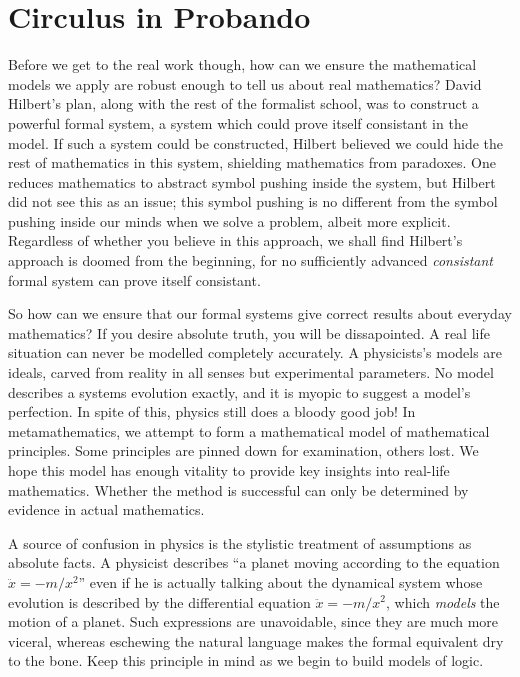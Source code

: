 \section{Circulus in Probando}

Before we get to the real work though, how can we ensure the mathematical models we apply are robust enough to tell us about real mathematics? David Hilbert's plan, along with the rest of the formalist school, was to construct a powerful formal system, a system which could prove itself consistant in the model. If such a system could be constructed, Hilbert believed we could hide the rest of mathematics in this system, shielding mathematics from paradoxes. One reduces mathematics to abstract symbol pushing inside the system, but Hilbert did not see this as an issue; this symbol pushing is no different from the symbol pushing inside our minds when we solve a problem, albeit more explicit. Regardless of whether you believe in this approach, we shall find Hilbert's approach is doomed from the beginning, for no sufficiently advanced {\it consistant} formal system can prove itself consistant.

So how can we ensure that our formal systems give correct results about everyday mathematics? If you desire absolute truth, you will be dissapointed. A real life situation can never be modelled completely accurately. A physicists's models are ideals, carved from reality in all senses but experimental parameters. No model describes a systems evolution exactly, and it is myopic to suggest a model's perfection. In spite of this, physics still does a bloody good job! In metamathematics, we attempt to form a mathematical model of mathematical principles. Some principles are pinned down for examination, others lost. We hope this model has enough vitality to provide key insights into real-life mathematics. Whether the method is successful can only be determined by evidence in actual mathematics.

A source of confusion in physics is the stylistic treatment of assumptions as absolute facts. A physicist describes ``a planet moving according to the equation $\ddot{x} = -m/x^2$'' even if he is actually talking about the dynamical system whose evolution is described by the differential equation $\ddot{x} = -m/x^2$, which {\it models} the motion of a planet. Such expressions are unavoidable, since they are much more viceral, whereas eschewing the natural language makes the formal equivalent dry to the bone. Keep this principle in mind as we begin to build models of logic.






